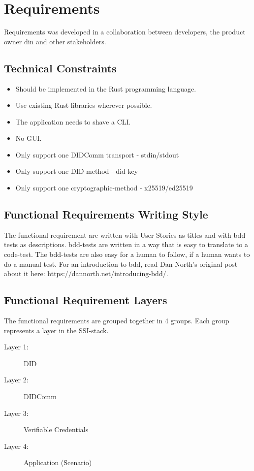 \chapter{Requirements}

Requirements was developed in a collaboration between developers, the product owner \acrshort{din} and other stakeholders.

\section{Technical Constraints}
\begin{itemize}
    \item Should be implemented in the Rust programming language.
    \item Use existing Rust libraries wherever possible.
    \item The application needs to shave a CLI.
    \item No GUI.
    \item Only support one DIDComm transport - stdin/stdout
    \item Only support one DID-method - did-key
    \item Only support one cryptographic-method - x25519/ed25519
\end{itemize}



\section{Functional Requirements Writing Style}

The functional requirement are written with User-Stories as titles and with \acrfull{bdd}-tests as descriptions. \acrshort{bdd}-tests are written in a way that is easy to translate to a code-test. The \acrshort{bdd}-tests are also easy for a human to follow, if a human wants to do a manual test. For an introduction to \acrfull{bdd}, read Dan North's original post about it here: https://dannorth.net/introducing-bdd/.



\newpage

\section{Functional Requirement Layers}

The functional requirements are grouped together in 4 groups. Each group represents a layer in the SSI-stack.
\begin{description}
    \item[Layer 1:] DID 
    \item[Layer 2:] DIDComm
    \item[Layer 3:] Verifiable Credentials
    \item[Layer 4:] Application (Scenario)
\end{description}


